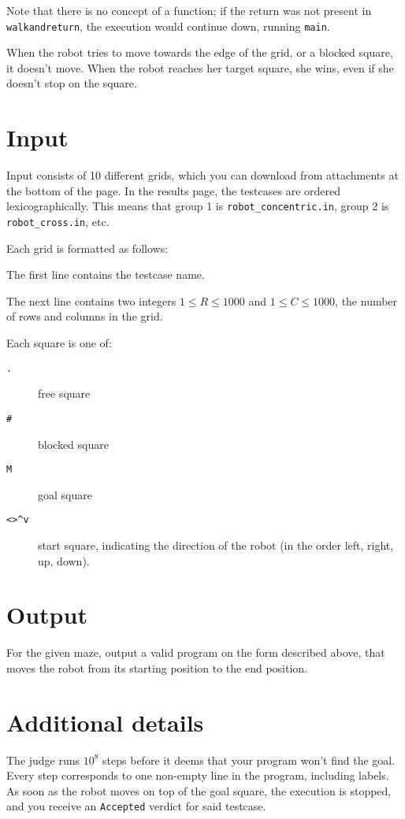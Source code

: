 Note that there is no concept of a function; if the return was not present in \texttt{walkandreturn}, the execution would continue down, running \texttt{main}.

When the robot tries to move towards the edge of the grid, or a blocked square, it doesn't move. When the robot reaches her target square, she wins, even if she doesn't stop on the square.

\section*{Input}
Input consists of 10 different grids, which you can download from attachments at the bottom of the page. In the results page,
the testcases are ordered lexicographically. This means that group 1 is \texttt{robot\_concentric.in}, group 2 is \texttt{robot\_cross.in}, etc.

Each grid is formatted as follows:

The first line contains the testcase name.

The next line contains two integers $1 \le R \le 1000$ and $1 \le C \le 1000$, the number of rows and columns in the grid.

Each square is one of:
\begin{description}
  \item[\texttt{.}] free square
  \item[\texttt{\#}] blocked square
  \item[\texttt{M}] goal square
  \item[\texttt{<>\textasciicircum{}v}] start square, indicating the direction of the robot (in the order left, right, up, down).
\end{description}

\section*{Output}
For the given maze, output a valid program on the form described above, that moves the robot from its starting position to the end position.

\section*{Additional details}
The judge runs $10^8$ steps before it deems that your program won't find the goal.
Every step corresponds to one non-empty line in the program, including labels. As soon as the robot
moves on top of the goal square, the execution is stopped, and you receive an \texttt{Accepted} verdict
for said testcase.


